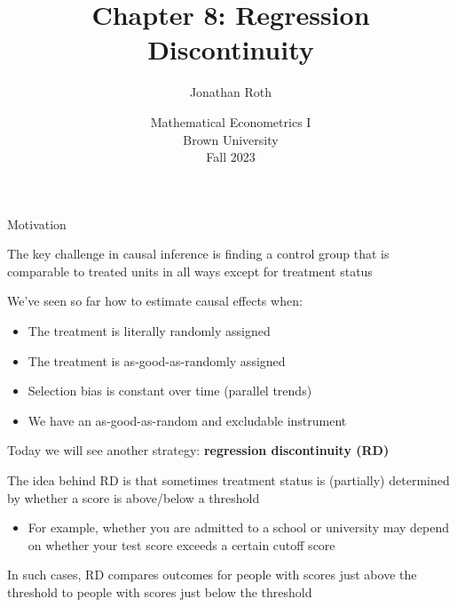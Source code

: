 \documentclass[11pt,english,handout]{beamer}
\newenvironment{wideitemize}{\itemize\addtolength{\itemsep}{10pt}}{\enditemize}
\begin{document}
	
	\begin{frame}[noframenumbering]{}
		\vspace{0.5cm}
		\title[]{Chapter 8: Regression Discontinuity}
		\author{Jonathan Roth}
		\date{Mathematical Econometrics I \\ Brown University\\Fall 2023} 
		\titlepage {\small{}\ }\thispagestyle{empty} \vspace{-30pt}
		
	\end{frame}

	
	\begin{frame}{Motivation}
		
		\vspace{0.2cm}
		\begin{wideitemize}
			\item
			The key challenge in causal inference is finding a control group that is comparable to treated units in all ways except for treatment status\pause{}
			
			\item
			We've seen so far how to estimate causal effects when:\smallskip\pause{}
			\begin{itemize}
			\item The treatment is literally randomly assigned \smallskip\pause{}
			\item The treatment is as-good-as-randomly assigned\smallskip\pause{}
			\item Selection bias is constant over time (parallel trends)\smallskip\pause{}
			\item We have an as-good-as-random and excludable instrument
			\end{itemize} 
						
			\pause
			\item
			Today we will see another strategy: \textbf{regression discontinuity (RD)}
			
			\pause			
			\item
			The idea behind RD is that sometimes treatment status is (partially) determined by whether a score is above/below a threshold
			\pause\smallskip
				\begin{itemize}
					\item 
					For example, whether you are admitted to a school or university may depend on whether your test score exceeds a certain cutoff score
				\end{itemize} 
			
			\pause
			\item
			In such cases, RD compares outcomes for people with scores just above the threshold to people with scores just below the threshold
		\end{wideitemize}
		
	\end{frame}
\end{document}
